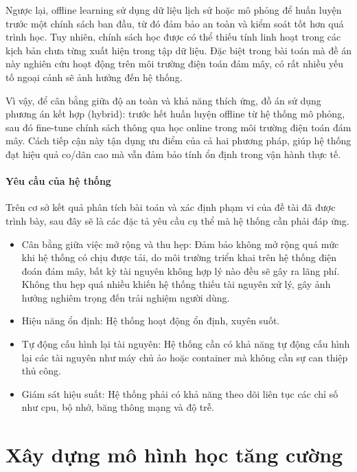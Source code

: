 Ngược lại, offline learning sử dụng dữ liệu lịch sử hoặc mô phỏng để huấn luyện trước một chính sách ban đầu, từ đó đảm bảo an toàn và kiểm soát tốt hơn quá trình học. Tuy nhiên, chính sách học được có thể thiếu tính linh hoạt trong các kịch bản chưa từng xuất hiện trong tập dữ liệu. Đặc biệt trong bài toán mà đề án này nghiên cứu hoạt động trên môi trường điện toán đám mây, có rất nhiều yếu tố ngoại cảnh sẽ ảnh hưởng đến hệ thống.

Vì vậy, để cân bằng giữa độ an toàn và khả năng thích ứng, đồ án sử dụng phương án kết hợp (hybrid): trước hết huấn luyện offline từ hệ thống mô phỏng, sau đó fine-tune chính sách thông qua học online trong môi trường điện toán đám mây. Cách tiếp cận này tận dụng ưu điểm của cả hai phương pháp, giúp hệ thống đạt hiệu quả co/dãn cao mà vẫn đảm bảo tính ổn định trong vận hành thực tế.

\paragraph{Yêu cầu của hệ thống}

Trên cơ sở kết quả phân tích bài toán và xác định phạm vi của đề tài đã được trình bày, sau đây sẽ là các đặc tả yêu cầu cụ thể mà hệ thống cần phải đáp ứng.

\begin{itemize}
    \item Cân bằng giữa việc mở rộng và thu hẹp: Đảm bảo không mở rộng quá mức khi hệ thống có chịu được tải, do môi trường triển khai trên hệ thống điện đoán đám mây, bất kỳ tài nguyên không hợp lý nào đều sẽ gây ra lãng phí. Không thu hẹp quá nhiều khiến hệ thống thiếu tài nguyên xử lý, gây ảnh hưởng nghiêm trọng đến trải nghiệm người dùng.
    \item Hiệu năng ổn định: Hệ thống hoạt động ổn định, xuyên suốt.
    \item Tự động cấu hình lại tài nguyên: Hệ thống cần có khả năng tự động cấu hình lại các tài nguyên như máy chủ ảo hoặc container mà không cần sự can thiệp thủ công.
    \item Giám sát hiệu suất: Hệ thống phải có khả năng theo dõi liên tục các chỉ số như \acrshort{cpu}, bộ nhớ, băng thông mạng và độ trễ.
\end{itemize}

\section{Xây dựng mô hình học tăng cường}

